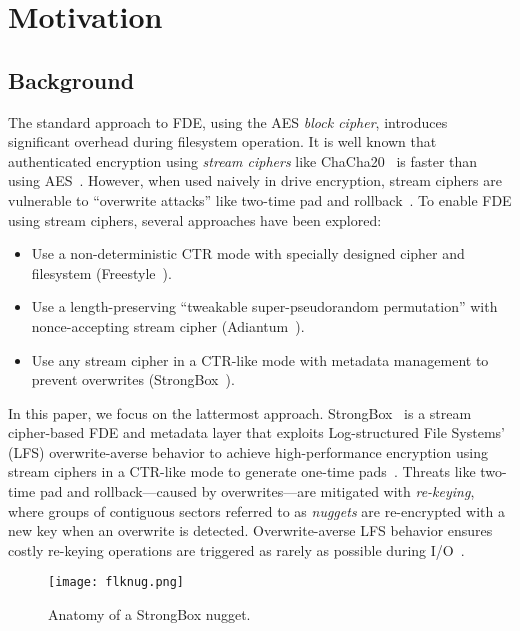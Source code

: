 \section{Motivation}\label{sec:motivation}

\subsection{Background}

The standard approach to FDE, using the AES \emph{block cipher}, introduces
significant overhead during filesystem operation. It is well known that
authenticated encryption using \emph{stream ciphers} like
ChaCha20~\cite{ChaCha20} is faster than using AES~\cite{StrongBox, AnotherPaper,
AnotherPaper}. However, when used naively in drive encryption, stream ciphers
are vulnerable to ``overwrite attacks'' like two-time pad and
rollback~\cite{StrongBox}. To enable FDE using stream ciphers, several
approaches have been explored:

\begin{itemize}
   \item Use a non-deterministic CTR mode with specially designed cipher and
   filesystem (Freestyle~\cite{Freestyle}).
   \item Use a length-preserving ``tweakable super-pseudorandom permutation''
   with nonce-accepting stream cipher (Adiantum~\cite{Adiantum}).
   \item Use any stream cipher in a CTR-like mode with metadata management to
   prevent overwrites (StrongBox~\cite{StrongBox}).
\end{itemize}

In this paper, we focus on the lattermost approach. StrongBox~\cite{StrongBox}
is a stream cipher-based FDE and metadata layer that exploits Log-structured
File Systems' (LFS) overwrite-averse behavior to achieve high-performance
encryption using stream ciphers in a CTR-like mode to generate one-time
pads~\cite{OTP}. Threats like two-time pad and rollback---caused by
overwrites---are mitigated with \emph{re-keying}, where groups of contiguous
sectors referred to as \emph{nuggets} are re-encrypted with a new key when an
overwrite is detected. Overwrite-averse LFS behavior ensures costly re-keying
operations are triggered as rarely as possible during I/O~\cite{StrongBox}.

\begin{figure}[ht]
   \centering
   \texttt{[image: flknug.png]}
   \caption{Anatomy of a StrongBox nugget.}\label{fig:flknug}
\end{figure}

